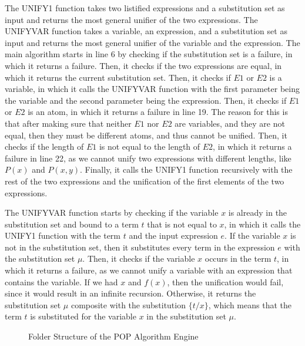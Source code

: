 The UNIFY1 function takes two listified expressions and a substitution set as input and returns the most general unifier of the two expressions. The UNIFYVAR function takes a variable, an expression, and a substitution set as input and returns the most general unifier of the variable and the expression. The main algorithm starts in line 6 by checking if the substitution set is a failure, in which it returns a failure. Then, it checks if the two expressions are equal, in which it returns the current substitution set. Then, it checks if $E1$ or $E2$ is a variable, in which it calls the UNIFYVAR function with the first parameter being the variable and the second parameter being the expression. Then, it checks if $E1$ or $E2$ is an atom, in which it returns a failure in line 19. The reason for this is that after making sure that neither $E1$ nor $E2$ are variables, and they are not equal, then they must be different atoms, and thus cannot be unified. Then, it checks if the length of $E1$ is not equal to the length of $E2$, in which it returns a failure in line 22, as we cannot unify two expressions with different lengths, like $P(x)$ and $P(x, y)$. Finally, it calls the UNIFY1 function recursively with the rest of the two expressions and the unification of the first elements of the two expressions.

The UNIFYVAR function starts by checking if the variable $x$ is already in the substitution set and bound to a term $t$ that is not equal to $x$, in which it calls the UNIFY1 function with the term $t$ and the input expression $e$. If the variable $x$ is not in the substitution set, then it substitutes every term in the expression $e$ with the substitution set $\mu$. Then, it checks if the variable $x$ occurs in the term $t$, in which it returns a failure, as we cannot unify a variable with an expression that contains the variable. If we had $x$ and $f(x)$, then the unification would fail, since it would result in an infinite recursion.
Otherwise, it returns the substitution set $\mu$ composite with the substitution $\{t/x\}$, which means that the term $t$ is substituted for the variable $x$ in the substitution set $\mu$.

\begin {figure}[h]
\caption{Folder Structure of the POP Algorithm Engine}
\label{fig:pop_folder_structure}
\end{figure}


